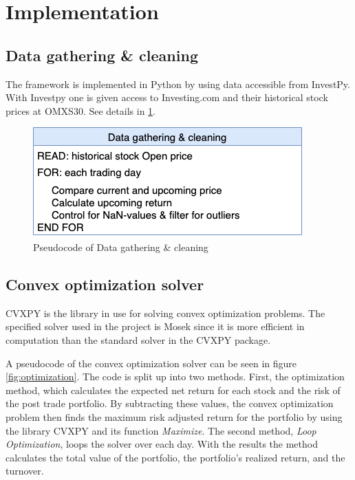 \documentclass[final]{LTHtwocol} %
\begin{document}
\section{Implementation}

\subsection{Data gathering \& cleaning}
The framework is implemented in Python by using data accessible from InvestPy. With Investpy one is given access to Investing.com and their historical stock prices at OMXS30. See details in \ref{fig:DATA_pseud}.

\begin{figure}[h]
	\centering
	\includegraphics[width=0.7\columnwidth]{Pics/DATA_pseud.png}
	\caption{Pseudocode of Data gathering \& cleaning}
	\label{fig:DATA_pseud} 
\end{figure}

\subsection{Convex optimization solver}

CVXPY is the library in use for solving convex optimization problems. The specified solver used in the project is Mosek since it is more efficient in computation than the standard solver in the CVXPY package.

A pseudocode of the convex optimization solver can be seen in figure \ref{fig:optimization}. The code is split up into two methods. First, the optimization method, which calculates the expected net return for each stock and the risk of the post trade portfolio. By subtracting these values, the convex optimization problem then finds the maximum risk adjusted return for the portfolio by using the library CVXPY and its function \textit{Maximize}.
The second method, \textit{Loop Optimization}, loops the solver over each day. With the results the method calculates the total value of the portfolio, the portfolio's realized return, and the turnover.
\end{document}
